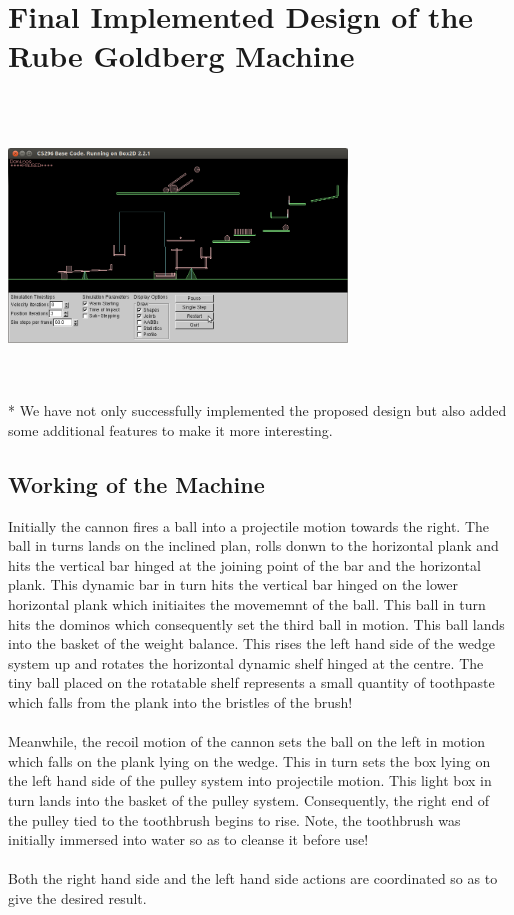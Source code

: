\documentclass[11pt]{article}
\begin{document}
\section{Final Implemented Design of the Rube Goldberg Machine} 
\includegraphics[height=8cm,width=9cm]{doc/actual-machine}
\\*
We have not only successfully implemented the proposed design but also added some additional features to make it more interesting.
\cite{box2d}\subsection{Working of the Machine}
Initially the cannon fires a ball into a projectile motion towards the right. The ball in turns lands on the inclined plan, rolls donwn to the horizontal plank and hits the vertical bar hinged at the joining point of the bar and the horizontal plank. This dynamic bar in turn hits the vertical bar hinged on the lower horizontal plank which initiaites the movememnt of the ball. This ball in turn hits the dominos which consequently set the third ball in motion. This ball lands into the basket of the weight balance. This rises the left hand side of the wedge system up and rotates the horizontal dynamic shelf hinged at the centre. The tiny ball placed on the rotatable shelf represents a small quantity of toothpaste which falls from the plank into the bristles of the brush!
\\
\\
Meanwhile, the recoil motion of the cannon sets the ball on the left in motion which falls on the plank lying on the wedge. This in turn sets the box lying on the left hand side of the pulley system into projectile motion. This light box in turn lands into the basket of the pulley system. Consequently, the right end of the pulley tied to the toothbrush begins to rise. Note, the toothbrush was initially immersed into water so as to cleanse it before use!
\\
\\
Both the right hand side and the left hand side actions are coordinated so as to give the desired result.
\end{document}
